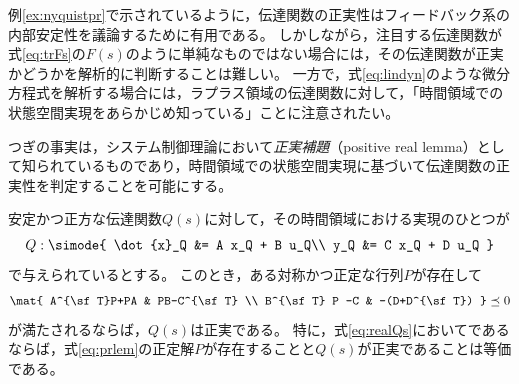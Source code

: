 \documentclass[tombow,dvipdfmx]{corona-a5}
\begin{document}
例\ref{ex:nyquistpr}で示されているように，伝達関数の正実性はフィードバック系の内部安定性を議論するために有用である。
しかしながら，注目する伝達関数が式\ref{eq:trFs}の$F(s)$のように単純なものではない場合には，その伝達関数が正実かどうかを解析的に判断することは難しい。
一方で，式\ref{eq:lindyn}のような微分方程式を解析する場合には，ラプラス領域の伝達関数に対して，「時間領域での状態空間実現をあらかじめ知っている」ことに注意されたい。

つぎの事実は，システム制御理論において\emph{正実補題}（positive real lemma）として知られているものであり\cite{rantzer1996kalman}，時間領域での状態空間実現に基づいて伝達関数の正実性を判定することを可能にする。

\begin{補題}\label{lem:prlem}
安定かつ正方な伝達関数$Q(s)$に対して，その時間領域における実現のひとつが
\begin{align}\label{eq:realQs}
Q: \simode{
\dot{x}_Q &= A x_Q + B u_Q\\
y_Q &= C x_Q + D u_Q
}
\end{align}
で与えられているとする。
このとき，ある対称かつ正定な行列$P$が存在して
\begin{align}\label{eq:prlem}
\mat{
A^{\sf T}P+PA & PB-C^{\sf T} \\
B^{\sf T} P -C & -(D+D^{\sf T})
}\preceq 0
\end{align}
が満たされるならば，$Q(s)$は正実である。
特に，式\ref{eq:realQs}においてであるならば，式\ref{eq:prlem}の正定解$P$が存在することと$Q(s)$が正実であることは等価である。
\end{補題}
\end{document}
